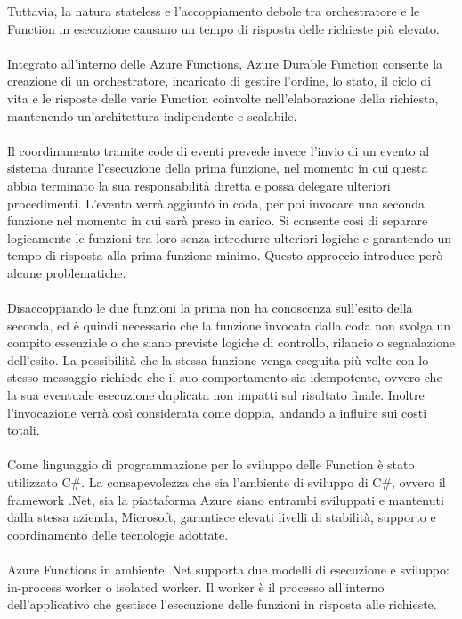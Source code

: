 Tuttavia, la natura stateless e l'accoppiamento debole tra orchestratore
e le Function in esecuzione causano un tempo di risposta delle richieste più elevato.\\
\\
Integrato all'interno delle Azure Functions,
Azure Durable Function consente la creazione di un orchestratore,
incaricato di gestire l'ordine, lo stato,
il ciclo di vita e le risposte delle varie Function coinvolte nell'elaborazione della richiesta,
mantenendo un'architettura indipendente e scalabile.\\
\\
Il coordinamento tramite code di eventi prevede 
invece l'invio di un evento al sistema
durante l'esecuzione della prima funzione,
nel momento in cui questa abbia terminato la sua responsabilità diretta
e possa delegare ulteriori procedimenti.
L'evento verrà aggiunto in coda,
per poi invocare una seconda funzione nel momento in cui sarà preso in carico.
Si consente così di separare logicamente le funzioni tra loro
senza introdurre ulteriori logiche e garantendo un tempo di risposta alla prima funzione minimo.
Questo approccio introduce però alcune problematiche.\\
\\
Disaccoppiando le due funzioni la prima
non ha conoscenza sull'esito della seconda,
ed è quindi necessario che la funzione invocata dalla coda
non svolga un compito essenziale
o che siano previste logiche di controllo,
rilancio o segnalazione dell'esito.
La possibilità che la stessa funzione
venga eseguita più volte con lo stesso messaggio
richiede che il suo comportamento sia idempotente,
ovvero che la sua eventuale esecuzione duplicata non impatti sul risultato finale.
Inoltre l'invocazione verrà così considerata come doppia,
andando a influire sui costi totali.\\
\\
Come linguaggio di programmazione per lo sviluppo delle Function è stato utilizzato C\#.
La consapevolezza che sia l'ambiente di sviluppo di C\#,
ovvero il framework .Net, sia la piattaforma Azure
siano entrambi sviluppati e mantenuti dalla stessa azienda, Microsoft,
garantisce elevati livelli di stabilità,
supporto e coordinamento delle tecnologie adottate.\\
\\
Azure Functions in ambiente .Net supporta due modelli di esecuzione e sviluppo:
in-process worker o isolated worker.
Il worker è il processo all'interno dell'applicativo che gestisce 
l'esecuzione delle funzioni in risposta alle richieste.
